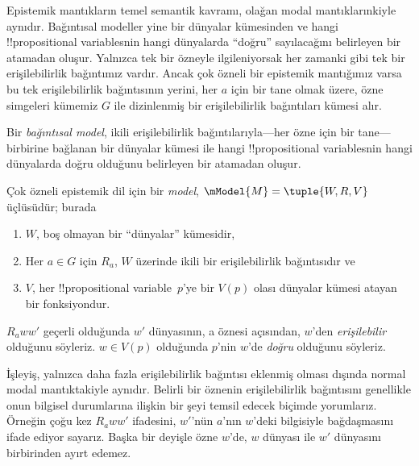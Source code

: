 



Epistemik mantıkların temel semantik kavramı, olağan modal mantıklarınkiyle
aynıdır. Bağıntısal modeller yine bir dünyalar kümesinden ve hangi
!!{propositional variable}s{}nin hangi dünyalarda ``doğru'' sayılacağını
belirleyen bir atamadan oluşur. Yalnızca tek bir özneyle ilgileniyorsak her
zamanki gibi tek bir erişilebilirlik bağıntımız vardır. Ancak çok özneli bir
epistemik mantığımız varsa bu tek erişilebilirlik bağıntısının yerini, her
$a$ için bir tane olmak üzere, özne simgeleri kümemiz $G$ ile dizinlenmiş bir
erişilebilirlik bağıntıları kümesi alır.

Bir \emph{bağıntısal model}, ikili erişilebilirlik bağıntılarıyla---her özne
için bir tane---birbirine bağlanan bir dünyalar kümesi ile hangi
!!{propositional variable}s{}nin hangi dünyalarda doğru olduğunu belirleyen bir
atamadan oluşur.

\begin{defn}
  Çok özneli epistemik dil için bir \emph{model}, $\mModel{M} = \tuple{W, R,
  V}$ üçlüsüdür; burada
  \begin{enumerate}
  \item $W$, boş olmayan bir ``dünyalar'' kümesidir,
  \item Her $a \in G$ için ${R}_a$, $W$ üzerinde ikili bir erişilebilirlik
  bağıntısıdır ve
  \item $V$, her !!{propositional variable}~$p$'ye bir $V(p)$ olası dünyalar
  kümesi atayan bir fonksiyondur.
  \end{enumerate}
  $R_a ww'$ geçerli olduğunda $w'$ dünyasının, a öznesi açısından,
  $w$'den \emph{erişilebilir} olduğunu söyleriz. $w \in V(p)$ olduğunda
  $p$'nin $w$'de \emph{doğru} olduğunu söyleriz.
\end{defn}

İşleyiş, yalnızca daha fazla erişilebilirlik bağıntısı eklenmiş olması dışında
normal modal mantıktakiyle aynıdır. Belirli bir öznenin erişilebilirlik
bağıntısını genellikle onun bilgisel durumlarına ilişkin bir şeyi temsil
edecek biçimde yorumlarız. Örneğin çoğu kez $R_a ww'$ ifadesini, $w'$'nün
$a$'nın $w$'deki bilgisiyle bağdaşmasını ifade ediyor sayarız. Başka bir
deyişle özne $w$'de, $w$ dünyası ile $w'$ dünyasını birbirinden ayırt edemez.

